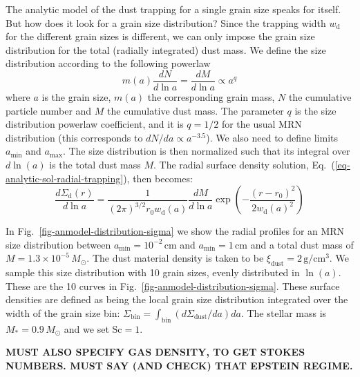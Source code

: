 \documentclass{aa}
\begin{document}
The analytic model of the dust trapping for a single grain size speaks for
itself. But how does it look for a grain size distribution? Since the trapping
width $w_{\mathrm{d}}$ for the different grain sizes is different, we can only
impose the grain size distribution for the total (radially integrated) dust
mass. We define the size distribution according to the following powerlaw
\begin{equation}
m(a)\frac{dN}{d\ln a} = \frac{dM}{d\ln a} \propto a^{q}
\end{equation}
where $a$ is the grain size, $m(a)$ the corresponding grain mass, $N$ the
cumulative particle number and $M$ the cumulative dust mass. The parameter $q$
is the size distribution powerlaw coefficient, and it is $q=1/2$ for the usual
MRN distribution (this corresponds to $dN/da\propto a^{-3.5}$). We also need to
define limits $a_{\mathrm{min}}$ and $a_{\mathrm{max}}$. The size distribution
is then normalized such that its integral over $d\ln(a)$ is the total dust mass
$M$. The radial surface density solution,
Eq.~(\ref{eq-analytic-sol-radial-trapping}), then becomes:
\begin{equation}\label{eq-analytic-sol-radial-trapping-sizedistr}
\frac{d\Sigma_{\mathrm{d}}(r)}{d\ln a} = \frac{1}{(2\pi)^{3/2}r_0
    w_{\mathrm{d}}(a)}\frac{dM}{d\ln a}
\exp\left(-\frac{(r-r_0)^2}{2w_{\mathrm{d}}(a)^2}\right)
\end{equation}

In Fig.~\ref{fig-anmodel-distribution-sigma} we show the radial profiles for an
MRN size distribution between $a_{\mathrm{min}}=10^{-2}\,\mathrm{cm}$ and
$a_{\mathrm{min}}=1\,\mathrm{cm}$ and a total dust mass of $M=1.3\times
10^{-5}\,M_\odot$. The dust material density is taken to be
$\xi_{\mathrm{dust}}=2\,\mathrm{g}/\mathrm{cm}^3$. We sample this size
distribution with 10 grain sizes, evenly distributed in $\ln(a)$. These are the
10 curves in Fig.~\ref{fig-anmodel-distribution-sigma}. These surface densities
are defined as being the local grain size distribution integrated over the width
of the grain size bin:
$\Sigma_{\mathrm{bin}}=\int_{\mathrm{bin}}(d\Sigma_{\mathrm{dust}}/da)da$. The
stellar mass is $M_{*}=0.9\,M_\odot$ and we set $\mathrm{Sc}=1$.

{\bf MUST ALSO SPECIFY GAS DENSITY, TO GET STOKES NUMBERS. MUST SAY
(AND CHECK) THAT EPSTEIN REGIME.}
\end{document}
